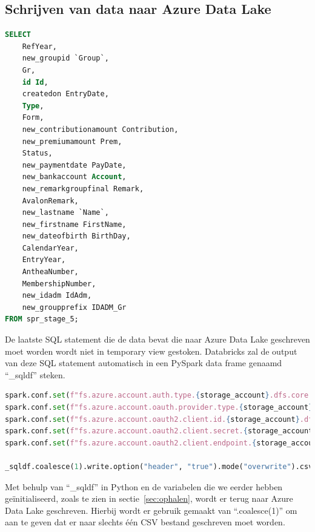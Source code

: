 \subsection{Schrijven van data naar Azure Data Lake}

\begin{lstlisting}[language=SQL, caption={Selecteren en hernoemen van kolommen in ``new\_syndicalpremiumrequest''.}, style=myStyle]
SELECT 
    RefYear, 
    new_groupid `Group`,
    Gr, 
    id Id, 
    createdon EntryDate,
    Type,
    Form,
    new_contributionamount Contribution,
    new_premiumamount Prem,
    Status,
    new_paymentdate PayDate,
    new_bankaccount Account,
    new_remarkgroupfinal Remark,
    AvalonRemark,
    new_lastname `Name`,
    new_firstname FirstName,
    new_dateofbirth BirthDay,
    CalendarYear,
    EntryYear,
    AntheaNumber,
    MembershipNumber,
    new_idadm IdAdm,
    new_groupprefix IDADM_Gr
FROM spr_stage_5;
\end{lstlisting}

De laatste SQL statement die de data bevat die naar Azure Data Lake geschreven moet worden wordt niet in temporary view gestoken. Databricks zal de output van deze SQL statement automatisch in een PySpark data frame genaamd ``\_sqldf'' steken.

\begin{lstlisting}[language=Python, caption={Schrijven van CSV bestand naar Azure Data Lake vanuit Azure Databricks.}, style=myStyle]
spark.conf.set(f"fs.azure.account.auth.type.{storage_account}.dfs.core.windows.net", "OAuth")
spark.conf.set(f"fs.azure.account.oauth.provider.type.{storage_account}.dfs.core.windows.net", "org.apache.hadoop.fs.azurebfs.oauth2.ClientCredsTokenProvider")
spark.conf.set(f"fs.azure.account.oauth2.client.id.{storage_account}.dfs.core.windows.net", app_id)
spark.conf.set(f"fs.azure.account.oauth2.client.secret.{storage_account}.dfs.core.windows.net", app_key)
spark.conf.set(f"fs.azure.account.oauth2.client.endpoint.{storage_account}.dfs.core.windows.net", f"https://login.microsoftonline.com/{tenant_id}/oauth2/token")

_sqldf.coalesce(1).write.option("header", "true").mode("overwrite").csv(f"abfss://target@{storage_account}.dfs.core.windows.net/databricks")
\end{lstlisting}

Met behulp van ``\_sqldf'' in Python en de variabelen die we eerder hebben geïnitialiseerd, zoals te zien in sectie~\ref{sec:ophalen}, wordt er terug naar Azure Data Lake geschreven. Hierbij wordt er gebruik gemaakt van ``.coalesce(1)'' om aan te geven dat er naar slechts één CSV bestand geschreven moet worden.

